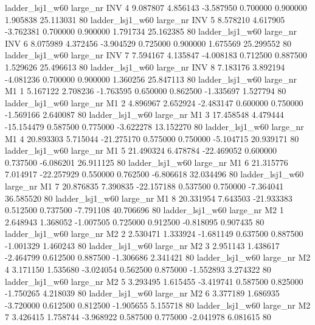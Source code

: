     ladder_lsj1_w60   large_nr      INV                 4  9.087807  4.856143  -3.587950 0.700000 0.900000  1.905838   25.113031 80
    ladder_lsj1_w60   large_nr      INV                 5  8.578210  4.617905  -3.762381 0.700000 0.900000  1.791734   25.162385 80
    ladder_lsj1_w60   large_nr      INV                 6  8.075989  4.372456  -3.904529 0.725000 0.900000  1.675569   25.299552 80
    ladder_lsj1_w60   large_nr      INV                 7  7.594167  4.135847  -4.008183 0.712500 0.887500  1.529626   25.496613 80
    ladder_lsj1_w60   large_nr      INV                 8  7.183176  3.892194  -4.081236 0.700000 0.900000  1.360256   25.847113 80
    ladder_lsj1_w60   large_nr       M1                 1  5.167122  2.708236  -1.763595 0.650000 0.862500 -1.335697    1.527794 80
    ladder_lsj1_w60   large_nr       M1                 2  4.896967  2.652924  -2.483147 0.600000 0.750000 -1.569166    2.640087 80
    ladder_lsj1_w60   large_nr       M1                 3 17.458548  4.479444 -15.154479 0.587500 0.775000 -3.622278   13.152270 80
    ladder_lsj1_w60   large_nr       M1                 4 20.893303  5.715044 -21.275170 0.575000 0.750000 -5.104715   20.939171 80
    ladder_lsj1_w60   large_nr       M1                 5 21.490324  6.478784 -22.469052 0.600000 0.737500 -6.086201   26.911125 80
    ladder_lsj1_w60   large_nr       M1                 6 21.315776  7.014917 -22.257929 0.550000 0.762500 -6.806618   32.034496 80
    ladder_lsj1_w60   large_nr       M1                 7 20.876835  7.390835 -22.157188 0.537500 0.750000 -7.364041   36.585520 80
    ladder_lsj1_w60   large_nr       M1                 8 20.331954  7.643503 -21.933383 0.512500 0.737500 -7.791108   40.706696 80
    ladder_lsj1_w60   large_nr       M2                 1  2.648943  1.368052  -1.007505 0.725000 0.912500 -0.818095    0.907435 80
    ladder_lsj1_w60   large_nr       M2                 2  2.530471  1.333924  -1.681149 0.637500 0.887500 -1.001329    1.460243 80
    ladder_lsj1_w60   large_nr       M2                 3  2.951143  1.438617  -2.464799 0.612500 0.887500 -1.306686    2.341421 80
    ladder_lsj1_w60   large_nr       M2                 4  3.171150  1.535680  -3.024054 0.562500 0.875000 -1.552893    3.274322 80
    ladder_lsj1_w60   large_nr       M2                 5  3.293495  1.615455  -3.419741 0.587500 0.825000 -1.750265    4.218039 80
    ladder_lsj1_w60   large_nr       M2                 6  3.377189  1.686935  -3.720000 0.612500 0.812500 -1.905655    5.155718 80
    ladder_lsj1_w60   large_nr       M2                 7  3.426415  1.758744  -3.968922 0.587500 0.775000 -2.041978    6.081615 80

